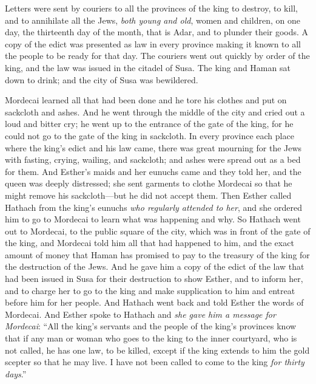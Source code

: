 \begin{biblechapter}
\verse Letters were sent by couriers to all the provinces of the king to destroy, to kill, and to annihilate all the Jews, \textit{both young and old}, women and children, on one day, the thirteenth day of the month, that is Adar, and to plunder their goods.
\verse A copy of the edict was presented as law in every province making it known to all the people to be ready for that day.
\verse The couriers went out quickly by order of the king, and the law was issued in the citadel of Susa. The king and Haman sat down to drink; and the city of Susa was bewildered.
\end{biblechapter}

\begin{biblechapter} %
 Mordecai learned all that had been done and he tore his clothes and put on sackcloth and ashes. And he went through the middle of the city and cried out a loud and bitter cry;
\verse he went up to the entrance of the gate of the king, for he could not go to the gate of the king in sackcloth.
\verse In every province each place where the king’s edict and his law came, there was great mourning for the Jews with fasting, crying, wailing, and sackcloth; and ashes were spread out as a bed for them.
\verse And Esther’s maids and her eunuchs came and they told her, and the queen was deeply distressed; she sent garments to clothe Mordecai so that he might remove his sackcloth—but he did not accept them.
\verse Then Esther called Hathach from the king’s eunuchs \textit{who regularly attended to her}, and she ordered him to go to Mordecai to learn what was happening and why.
\verse So Hathach went out to Mordecai, to the public square of the city, which was in front of the gate of the king,
\verse and Mordecai told him all that had happened to him, and the exact amount of money that Haman has promised to pay to the treasury of the king for the destruction of the Jews.
\verse And he gave him a copy of the edict of the law that had been issued in Susa for their destruction to show Esther, and to inform her, and to charge her to go to the king and make supplication to him and entreat before him for her people.
\verse And Hathach went back and told Esther the words of Mordecai.
\verse And Esther spoke to Hathach and \textit{she gave him a message for Mordecai}:
\verse “All the king’s servants and the people of the king’s provinces know that if any man or woman who goes to the king to the inner courtyard, who is not called, he has one law, to be killed, except if the king extends to him the gold scepter so that he may live. I have not been called to come to the king \textit{for thirty days}.”

\end{biblechapter}
